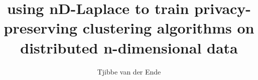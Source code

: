 \documentclass{ou-report}
\begin{document}
\pagestyle{plain}
\title{using nD-Laplace to train privacy-preserving clustering algorithms on distributed n-dimensional data}
\author{Tjibbe van der Ende}
%



\frontmatter
\renewcommand{\algorithmicrequire}{\textbf{Input:}}
\renewcommand{\algorithmicensure}{\textbf{Output:}}
\let\cleardoublepage\clearpage

%

%
\tableofcontents



%
%



\mainmatter
{}







\newpage

\newpage

\newpage


%

%

%

%

%



\backmatter
{}





%  
%  
%  
\clearpage
\printglossaries

\appendix



\end{document}
